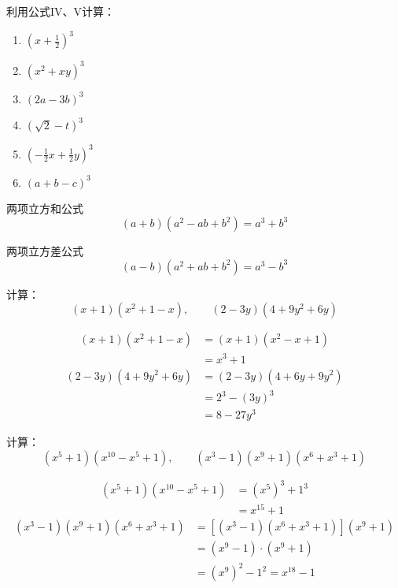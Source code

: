 \begin{ex}
利用公式IV、V计算：
   \begin{multicols}{2}
\begin{enumerate}
    \item $\left(x+\frac{1}{2}\right)^3$
    \item $(x^2+xy)^3$
    \item $(2a-3b)^3$
    \item $\left(\sqrt{2}-t\right)^3$
    \item $\left(-\frac{1}{2}x+\frac{1}{2}y\right)^3$
    \item $(a+b-c)^3$
\end{enumerate}   
    \end{multicols}
\end{ex}

\begin{blk}{两项立方和公式}
    \begin{equation*}
        (a+b)(a^2-ab+b^2)=a^3+b^3 \tag{VI}  
    \end{equation*}
\end{blk}

\begin{blk}{两项立方差公式}
    \begin{equation*}
        (a-b)(a^2+ab+b^2)=a^3-b^3 \tag{VII}  
    \end{equation*}
\end{blk}

\begin{example}
    计算：
    \[(x+1)(x^2+1-x),\qquad (2-3y)(4+9y^2+6y) \]
\end{example}

\begin{solution}
\[\begin{split}
    (x+1)(x^2+1-x)&=(x+1)(x^2-x+1)\\
    &=x^3+1
\end{split}  \]
\[\begin{split}
    (2-3y)(4+9y^2+6y) &= (2-3y)(4+6y+9y^2)\\
    &=2^3-(3y)^3\\
    &=8-27y^3 
\end{split}\]
\end{solution}

\begin{example}
    计算：
    \[(x^5+1)(x^{10}-x^5+1),\qquad (x^3-1)(x^9+1)(x^6+x^3+1)\]
\end{example}

\begin{solution}
    \[\begin{split}
        (x^5+1)(x^{10}-x^5+1)&=(x^5)^3+1^3\\
        &=x^{15}+1
    \end{split}\]
    \[\begin{split}
        (x^3-1)(x^9+1)(x^6+x^3+1)& = [(x^3-1)(x^6+x^3+1)](x^9+1)\\
&=(x^9-1)\cdot (x^9+1)\\
&=(x^9)^2-1^2= x^{18}-1
    \end{split}\]
\end{solution}

